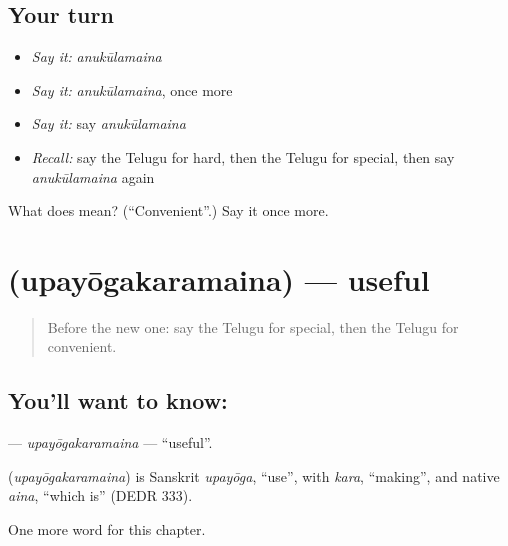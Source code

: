 \subsection*{Your turn}
\begin{itemize}
\raggedright
  \item \emph{Say it:} \emph{anukūlamaina}
  \item \emph{Say it:} \emph{anukūlamaina}, once more
  \item \emph{Say it:} say \emph{anukūlamaina}
  \item \emph{Recall:} say the Telugu for hard, then the Telugu for special, then say \emph{anukūlamaina} again
\end{itemize}

\begin{tcolorbox}[breakable,colback=teal!4,colframe=teal!35!black,title={Before you move on}]
What does  mean? (\textquotedblleft{}Convenient\textquotedblright{}.) Say it once more.
\end{tcolorbox}
\section[\texorpdfstring{\te{ఉపయోగకరమైన} (upayōgakaramaina)}{ఉపయోగకరమైన (upayōgakaramaina)}]{ (upayōgakaramaina) — useful}

\label{lesson:TE-C296-upayogakaramaina}



\begin{quote}
Before the new one: say the Telugu for special, then the Telugu for convenient.
\end{quote}

\subsection*{You'll want to know: }
\textbf{} — \emph{upayōgakaramaina} — \textquotedblleft{}useful\textquotedblright{}.

\begin{cousinweb}
\textbf{} (\emph{upayōgakaramaina}) is Sanskrit \emph{upayōga}, \textquotedblleft{}use\textquotedblright{}, with \emph{kara}, \textquotedblleft{}making\textquotedblright{}, and native \emph{aina}, \textquotedblleft{}which is\textquotedblright{} (DEDR 333).
\end{cousinweb}

\begin{grammarlens}[title={What you've built}]
One more word for this chapter.
\end{grammarlens}

